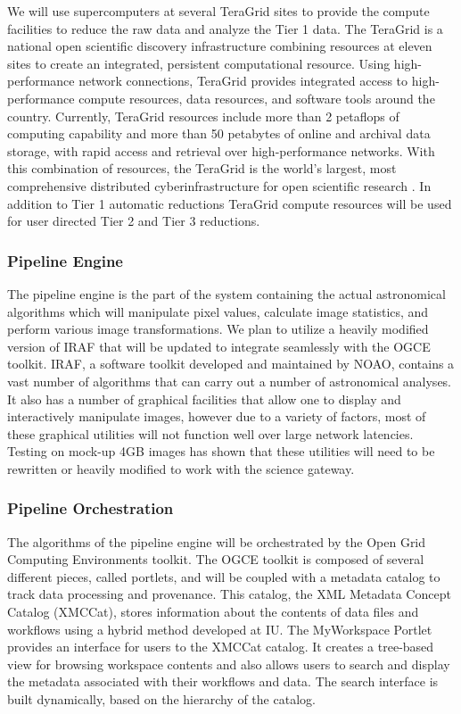 \documentclass[10pt,conference]{IEEEtran}
\begin{document}
We will use supercomputers at several TeraGrid sites to provide the compute facilities to reduce the raw data and analyze the Tier 1 data. The TeraGrid is a national open scientific discovery infrastructure combining resources at eleven sites to create an integrated, persistent computational resource. Using high-performance network connections, TeraGrid provides integrated access to high-performance compute resources, data resources, and software tools around the country. Currently, TeraGrid resources include more than 2 petaflops of computing capability and more than 50 petabytes of online and archival data storage, with rapid access and retrieval over high-performance networks. With this combination of resources, the TeraGrid is the world's largest, most comprehensive distributed cyberinfrastructure for open scientific research \cite{teragrid}. In addition to Tier 1 automatic reductions TeraGrid compute resources will be used for user directed Tier 2 and Tier 3 reductions.

\subsubsection{Pipeline Engine}

The pipeline engine is the part of the system containing the actual astronomical algorithms which will manipulate pixel values, calculate image statistics, and perform various image transformations. We plan to utilize a heavily modified version of IRAF that will be updated to integrate seamlessly with the OGCE toolkit. IRAF, a software toolkit developed and maintained by NOAO, contains a vast number of algorithms that can carry out a number of astronomical analyses. It also has a number of graphical facilities that allow one to display and interactively manipulate images, however due to a variety of factors, most of these graphical utilities will not function well over large network latencies. Testing on mock-up 4GB images has shown that these utilities will need to be rewritten or heavily modified to work with the science gateway. 

\subsubsection{Pipeline Orchestration}

The algorithms of the pipeline engine will be orchestrated by the Open Grid Computing Environments toolkit. The OGCE toolkit is composed of several different pieces, called portlets, and will be coupled with a metadata catalog to track data processing and provenance. This catalog, the XML Metadata Concept Catalog (XMCCat)\cite{jensen2008}, stores information about the contents of data files and workflows using a hybrid method developed at IU. The MyWorkspace Portlet provides an interface for users to the XMCCat catalog. It creates a tree-based view for browsing workspace contents and also allows users to search and display the metadata associated with their workflows and data. The search interface is built dynamically, based on the hierarchy of the catalog. 
\end{document}
